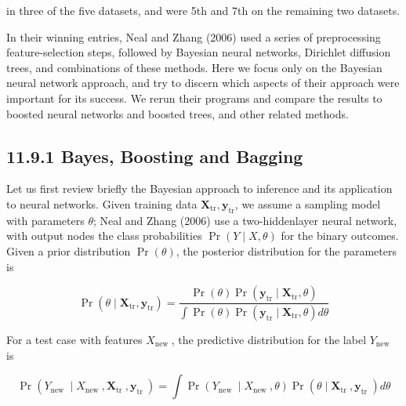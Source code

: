 \documentclass[10pt]{article}
\begin{document}
in three of the five datasets, and were 5th and 7th on the remaining two datasets.

In their winning entries, Neal and Zhang (2006) used a series of preprocessing feature-selection steps, followed by Bayesian neural networks, Dirichlet diffusion trees, and combinations of these methods. Here we focus only on the Bayesian neural network approach, and try to discern which aspects of their approach were important for its success. We rerun their programs and compare the results to boosted neural networks and boosted trees, and other related methods.

\subsection*{11.9.1 Bayes, Boosting and Bagging}
Let us first review briefly the Bayesian approach to inference and its application to neural networks. Given training data $\mathbf{X}_{\mathrm{tr}}, \mathbf{y}_{\mathrm{tr}}$, we assume a sampling model with parameters $\theta$; Neal and Zhang (2006) use a two-hiddenlayer neural network, with output nodes the class probabilities $\operatorname{Pr}(Y \mid X, \theta)$ for the binary outcomes. Given a prior distribution $\operatorname{Pr}(\theta)$, the posterior distribution for the parameters is


\begin{equation*}
\operatorname{Pr}\left(\theta \mid \mathbf{X}_{\mathrm{tr}}, \mathbf{y}_{\mathrm{tr}}\right)=\frac{\operatorname{Pr}(\theta) \operatorname{Pr}\left(\mathbf{y}_{\mathrm{tr}} \mid \mathbf{X}_{\mathrm{tr}}, \theta\right)}{\int \operatorname{Pr}(\theta) \operatorname{Pr}\left(\mathbf{y}_{\mathrm{tr}} \mid \mathbf{X}_{\mathrm{tr}}, \theta\right) d \theta} \tag{11.19}
\end{equation*}


For a test case with features $X_{\text {new }}$, the predictive distribution for the label $Y_{\text {new }}$ is


\begin{equation*}
\operatorname{Pr}\left(Y_{\text {new }} \mid X_{\text {new }}, \mathbf{X}_{\text {tr }}, \mathbf{y}_{\text {tr }}\right)=\int \operatorname{Pr}\left(Y_{\text {new }} \mid X_{\text {new }}, \theta\right) \operatorname{Pr}\left(\theta \mid \mathbf{X}_{\text {tr }}, \mathbf{y}_{\text {tr }}\right) d \theta \tag{11.20}
\end{equation*}
\end{document}
